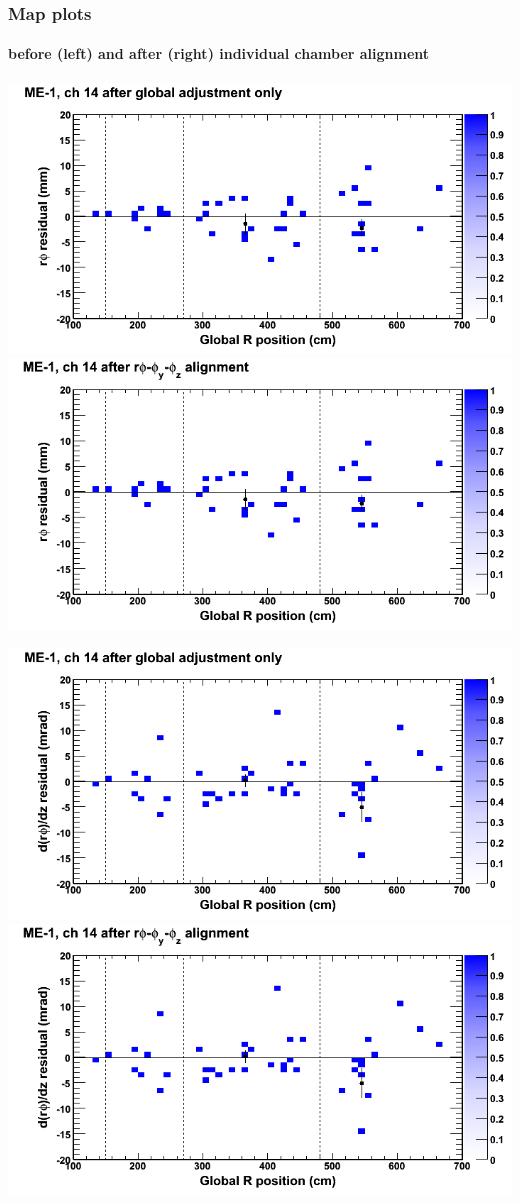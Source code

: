 \documentclass[compress]{beamer}
\begin{document}
\begin{frame}
\frametitle{Map plots}
\framesubtitle{before (left) and after (right) individual chamber alignment}
\includegraphics[width=0.5\linewidth]{ringmapplots_3dof/before_CSCvsr_mem1ch14_x.png} \includegraphics[width=0.5\linewidth]{ringmapplots_3dof/after_CSCvsr_mem1ch14_x.png}

\includegraphics[width=0.5\linewidth]{ringmapplots_3dof/before_CSCvsr_mem1ch14_dxdz.png} \includegraphics[width=0.5\linewidth]{ringmapplots_3dof/after_CSCvsr_mem1ch14_dxdz.png}
\end{frame}
\end{document}
